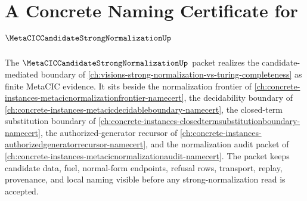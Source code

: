 \chapter{A Concrete Naming Certificate for $\MetaCICCandidateStrongNormalizationUp$}
\label{ch:concrete-instances-metacic-candidate-strong-normalization-namecert}

The $\MetaCICCandidateStrongNormalizationUp$ packet realizes the candidate-mediated boundary of \autoref{ch:visions-strong-normalization-vs-turing-completeness} as finite MetaCIC evidence. It sits beside the normalization frontier of \autoref{ch:concrete-instances-metacicnormalizationfrontier-namecert}, the decidability boundary of \autoref{ch:concrete-instances-metacicdecidableboundary-namecert}, the closed-term substitution boundary of \autoref{ch:concrete-instances-closedtermsubstitutionboundary-namecert}, the authorized-generator recursor of \autoref{ch:concrete-instances-authorizedgeneratorrecursor-namecert}, and the normalization audit packet of \autoref{ch:concrete-instances-metacicnormalizationaudit-namecert}. The packet keeps candidate data, fuel, normal-form endpoints, refusal rows, transport, replay, provenance, and local naming visible before any strong-normalization read is accepted.

